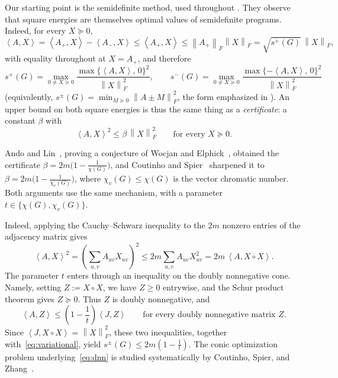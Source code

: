 \documentclass[11pt,letterpaper,reqno]{amsart}
\theoremstyle{definition}
\newcommand{\ip}[2]{\left\langle #1,#2\right\rangle}
\newcommand{\norm}[1]{\left\lVert #1\right\rVert}
\newcommand{\ppar}[1]{\par\addvspace{\medskipamount}\noindent{\bfseries #1.}\enspace\ignorespaces}
\begin{document}
Our starting point is the semidefinite method, used throughout
\cite{AL,CS,CSZ,Zh}. They observe that square energies are themselves optimal
values of semidefinite programs.  Indeed, for every $X\succeq0$,
\[
    \ip AX=\ip{A_+}{X}-\ip{A_-}{X}
    \le\ip{A_+}{X}
    \le\norm{A_+}_F\norm X_F
    =\sqrt{s^+(G)}\,\norm X_F,
\]
with equality throughout at $X=A_+$, and therefore
\begin{equation}\label{eq:variational}
    s^+(G)=\max_{0\ne X\succeq0}
    \frac{\max\{\ip AX,\,0\}^2}{\norm X_F^2},
    \qquad
    s^-(G)=\max_{0\ne X\succeq0}
    \frac{\max\{-\ip AX,\,0\}^2}{\norm X_F^2}
\end{equation}
(equivalently, $s^\pm(G)=\min_{M\succeq0}\norm{A\pm M}_F^2$, the form
emphasized in \cite{Zh}).  An upper bound on both square energies is
thus the same thing as a \emph{certificate}: a constant $\beta$ with
\[
    \ip{A}{X}^{2}\le\beta\,\norm X_F^2
    \qquad\text{for every }X\succeq0.
\]

\ppar{Earlier certificates}
Ando and Lin~\cite{AL}, proving a conjecture of Wocjan and
Elphick~\cite{WE}, obtained the certificate
$\beta=2m\bigl(1-\tfrac1{\chi(G)}\bigr)$, and Coutinho and
Spier~\cite{CS} sharpened it to
$\beta=2m\bigl(1-\tfrac1{\chi_v(G)}\bigr)$, where
$\chi_v(G)\le\chi(G)$ is the vector chromatic number. Both arguments use the same mechanism, with a parameter
$t\in\{\chi(G),\chi_v(G)\}$.




Indeed, applying the Cauchy--Schwarz inequality to the $2m$ nonzero
entries of the adjacency matrix gives
\[
    \ip{A}{X}^{2}
    =
    \left(\sum_{u,v}A_{uv}X_{uv}\right)^2
    \le
    2m\sum_{u,v}A_{uv}X_{uv}^{2}
    =
    2m\,\ip{A}{X\circ X}.
\]
The parameter $t$ enters through an inequality on the doubly
nonnegative cone. Namely, setting $Z:=X\circ X$, we have $Z\ge0$
entrywise, and the Schur product theorem gives $Z\succeq0$. Thus $Z$
is doubly nonnegative, and
\begin{equation}\label{eq:dnn}
    \ip{A}{Z}
    \le
    \left(1-\frac{1}{t}\right)\ip{J}{Z}
    \qquad
    \text{for every doubly nonnegative matrix }Z.
\end{equation}
Since $\ip{J}{X\circ X}=\norm{X}_F^2$, these two inequalities, together with~\eqref{eq:variational}, yield \(s^\pm(G) \le 2m\left(1-\frac{1}{t}\right)\).
The conic optimization problem underlying~\eqref{eq:dnn} is studied
systematically by Coutinho, Spier, and Zhang~\cite{CSZ}.
\end{document}

